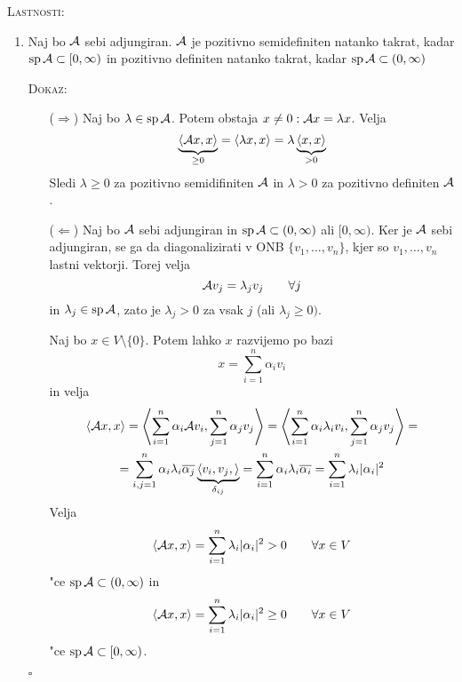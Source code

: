 \textsc{Lastnosti:}
\begin{enumerate}
    \item Naj bo $\mathcal{A}$ sebi adjungiran. $\mathcal{A}$ je pozitivno semidefiniten natanko takrat, kadar $\operatorname{sp} \mathcal{A} \subset [0, \infty)$ in pozitivno definiten natanko takrat, kadar $\operatorname{sp} \mathcal{A} \subset (0, \infty)$
    
    \textsc{Dokaz:}
    \begin{itemize}
        \item[($\Rightarrow$)] Naj bo $\lambda \in \operatorname{sp} \mathcal{A}$. Potem obstaja $x \neq 0: \mathcal{A} x = \lambda x$. Velja
        \begin{equation*}
        \underbrace{\langle \mathcal{A} x, x \rangle}_{\geq 0} = \langle \lambda x,x  \rangle = \lambda \underbrace{\langle x, x \rangle}_{> 0}
        \end{equation*}
        Sledi $\lambda \geq 0$ za pozitivno semidifiniten $\mathcal{A}$ in $\lambda > 0$ za pozitivno definiten $\mathcal{A}$.
        
        \item[($\Leftarrow$)] Naj bo $\mathcal{A}$ sebi adjungiran in $\operatorname{sp} \mathcal{A} \subset (0, \infty)$ ali $[0, \infty)$. Ker je $\mathcal{A}$ sebi adjungiran, se ga da diagonalizirati v ONB $\{ v_1, \ldots, v_n \}$, kjer so $v_1, \ldots, v_n$ lastni vektorji. Torej velja
        \begin{equation*}
        \mathcal{A} v_j = \lambda_j v_j \qquad \forall j
        \end{equation*}
        in $\lambda_j \in \operatorname{sp} \mathcal{A}$, zato je $\lambda_j > 0$ za vsak $j$ (ali $\lambda_j \geq 0)$.
        
        Naj bo $x \in V \setminus \{ 0 \}$. Potem lahko $x$ razvijemo po bazi
        \begin{equation*}
        x = \sum_{i = 1}^n \alpha_i v_i
        \end{equation*}
        in velja
        \begin{multline*}
        \langle \mathcal{A} x, x \rangle = \left\langle \sum_{i=1}^n \alpha_i \mathcal{A} v_i, \sum_{j = 1}^n \alpha_j v_j \right\rangle = \left\langle \sum_{i=1}^n \alpha_i \lambda_i v_i, \sum_{j=1}^n \alpha_j v_j \right\rangle = \\
        = \sum_{i,j = 1}^n \alpha_i \lambda_i \overline{\alpha_j} \underbrace{\langle v_i, v_j, \rangle}_{\delta_{ij}} = \sum_{i=1}^n \alpha_i \lambda_i \overline{\alpha_i} = \sum_{i=1}^n \lambda_i |\alpha_i|^2
        \end{multline*}
        Velja
        \begin{equation*}
        \langle \mathcal{A} x, x \rangle = \sum_{i=1}^n \lambda_i |\alpha_i|^2 > 0 \qquad \forall x \in V
        \end{equation*}
        "ce $\operatorname{sp} \mathcal{A} \subset (0, \infty)$ in 
        \begin{equation*}
        \langle \mathcal{A} x, x \rangle = \sum_{i=1}^n \lambda_i |\alpha_i|^2 \geq 0 \qquad \forall x \in V
        \end{equation*}
        "ce $\operatorname{sp} \mathcal{A} \subset [0, \infty)$.
    \end{itemize}
    \hfill $\square$
\end{enumerate}

